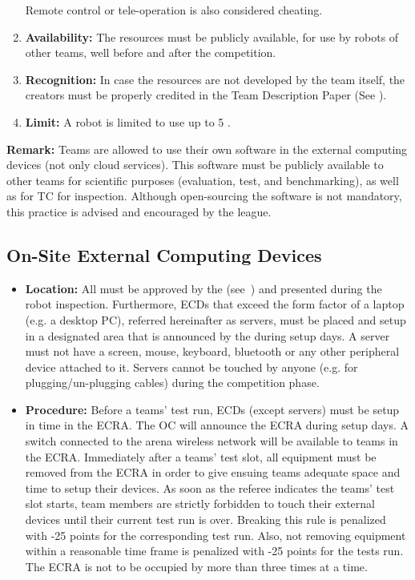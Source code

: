 \begin{enumerate}
	  Remote control or tele-operation is also considered cheating. 
	\item \textbf{Availability:} The resources must be publicly available, for use by robots of other teams, well before and after the competition.
	\item \textbf{Recognition:} In case the resources are not developed by the team itself, the creators must be properly credited in the Team Description Paper (See ).
	\item \textbf{Limit:} A robot is limited to use up to 5 . 
\end{enumerate}

\textbf{Remark:} Teams are allowed to use their own software in the external computing devices (not only cloud services). This software must be publicly available to other teams for scientific purposes (evaluation, test, and benchmarking), as well as for TC for inspection. Although open-sourcing the software is not mandatory, this practice is advised and encouraged by the league.

\subsection{On-Site External Computing Devices}
\label{rule:robot_external_computing_devices}

\begin{itemize}
  \item \textbf{Location:} All  must be approved by the 
  		(see~) and presented during the robot inspection. Furthermore, ECDs
  		that exceed the form factor of a laptop (e.g. a desktop PC), referred hereinafter as servers, must be placed and
  		setup in a designated area that is announced by the  during setup days.
  		A server must not have a screen, mouse, keyboard, bluetooth or any other peripheral device attached to it.
  		Servers cannot be touched by anyone (e.g. for plugging/un-plugging cables) during the competition phase.
  \item \textbf{Procedure:} Before a teams' test run, ECDs (except servers) must be setup in time in the
		 {ECRA}. The OC will announce the
        ECRA during setup days. A switch connected to the arena wireless network will be available to teams in the ECRA.
  		Immediately after a teams' test slot, all equipment must be removed from the ECRA in order to give ensuing
        teams adequate space and time to setup their devices. As soon as the referee indicates the teams' test slot
        starts, team members are strictly forbidden to touch their external devices until their current test run is over.
        Breaking this  rule is penalized with -25 points for the corresponding test run. Also, not removing
        equipment within a reasonable time frame is penalized with -25 points for the tests run. The ECRA is not to be
		occupied by more than three times at a time.
\end{itemize}


